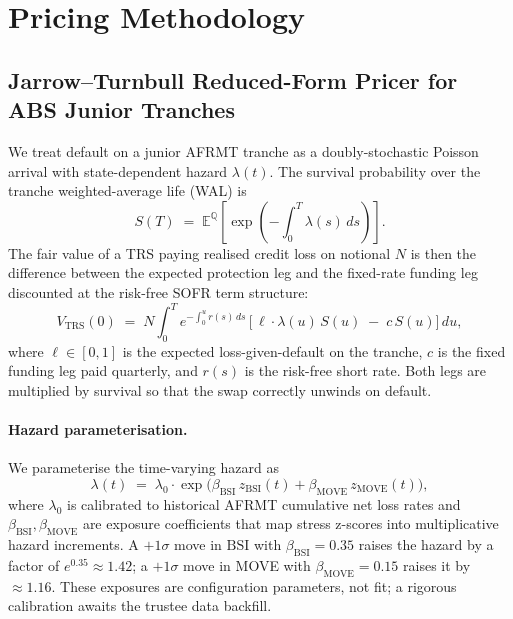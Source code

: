 \documentclass[11pt,letterpaper]{article}
\newcommand{\bsi}{\text{BSI}}
\newcommand{\move}{\text{MOVE}}
\newcommand{\z}{z}
\begin{document}
\section{Pricing Methodology}
\label{sec:pricing}

\subsection{Jarrow--Turnbull Reduced-Form Pricer for ABS Junior Tranches}

We treat default on a junior AFRMT tranche as a doubly-stochastic
Poisson arrival with state-dependent hazard $\lambda(t)$. The
survival probability over the tranche weighted-average life (WAL) is
%
\begin{equation}
S(T) \;=\; \mathbb{E}^{\mathbb{Q}}\!\left[\exp\!\left(
-\int_0^T \lambda(s)\, ds
\right)\right].
\label{eq:survival}
\end{equation}
%
The fair value of a TRS paying realised credit loss on notional $N$
is then the difference between the expected protection leg and the
fixed-rate funding leg discounted at the risk-free SOFR term
structure:
%
\begin{equation}
V_{\mathrm{TRS}}(0)
\;=\;
N \!\!\int_0^T\!\!\! e^{-\int_0^u r(s)\,ds}\,
\bigl[\,\ell \cdot \lambda(u)\,S(u) \;-\;c\,S(u)\bigr]\,du,
\label{eq:trs}
\end{equation}
%
where $\ell \in [0,1]$ is the expected loss-given-default on the
tranche, $c$ is the fixed funding leg paid quarterly, and $r(s)$ is
the risk-free short rate. Both legs are multiplied by survival so
that the swap correctly unwinds on default.

\paragraph{Hazard parameterisation.}
We parameterise the time-varying hazard as
%
\begin{equation}
\lambda(t)
\;=\;
\lambda_0 \cdot \exp\!\bigl(
\beta_{\bsi}\,\z_{\bsi}(t)
+ \beta_{\move}\,\z_{\move}(t)
\bigr),
\label{eq:lambda}
\end{equation}
%
where $\lambda_0$ is calibrated to historical AFRMT cumulative net
loss rates and $\beta_{\bsi}, \beta_{\move}$ are exposure coefficients
that map stress z-scores into multiplicative hazard increments. A
$+1\sigma$ move in $\bsi$ with $\beta_{\bsi} = 0.35$ raises the
hazard by a factor of $e^{0.35} \approx 1.42$; a $+1\sigma$ move in
MOVE with $\beta_{\move} = 0.15$ raises it by $\approx 1.16$. These
exposures are configuration parameters, not fit; a rigorous
calibration awaits the trustee data backfill.
\end{document}
